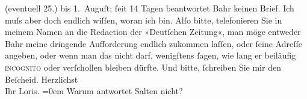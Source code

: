\begin{ledgroupsized}[t]{13cm}
                    (eventuell 25.) bis 1. Auguſt; ſeit 14 Tagen
                    beantwortet Bahr keinen Brief. Ich muſs aber
                    doch endlich wiſſen, {\pb}woran
                    ich bin. Alſo bitte, telefonieren Sie in meinem Namen an die Redaction der »Deutſchen Zeitung«, man möge entweder Bahr meine dringende Aufforderung endlich
                    zukommen laſſen, oder ſeine Adreſſe angeben, oder wenn man das nicht darf,
                    wenigſtens ſagen, wie lang er beiläufig \textsc{incognito} oder
                    verſchollen bleiben dürfte. Und bitte, ſchreiben Sie mir  den Beſcheid.\pend
           \pstart
           Herzlichst{\\[\baselineskip]}Ihr \spacefill\mbox{Loris.}\pend
           \leftskip=0em{}\pstart
           \noindent{}Warum antwortet Salten nicht?\pend
           \endnumbering{}\end{ledgroupsized}  \newcommand{\dateiname}{L00238}\newcommand{\titel}{Hugo von Hofmannsthal an Arthur Schnitzler, 19. 7. 1893}\newcommand{\editorInnen}{ Martin Anton Müller und Gerd-Hermann Susen}
      